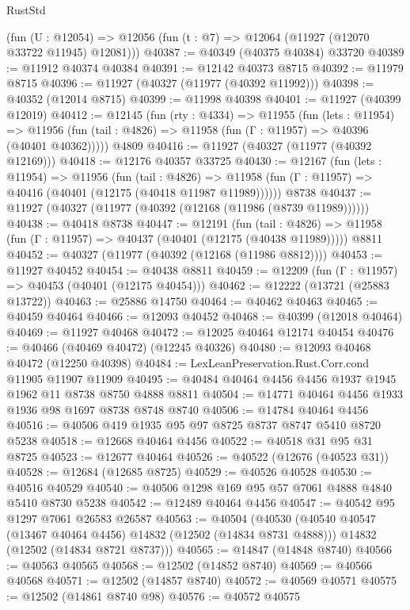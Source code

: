 \begin{lexlean}{RustStd}
\begin{coremodule}
    (fun (U : @12054) => @12056 (fun (t : @7) => @12064 (@11927 (@12070 @33722 @11945) @12081)))
@40387 := @40349 (@40375 @40384) @33720
@40389 := @11912 @40374 @40384
@40391 := @12142 @40373 @8715
@40392 := @11979 @8715
@40396 := @11927 (@40327 (@11977 (@40392 @11992)))
@40398 := @40352 (@12014 @8715)
@40399 := @11998 @40398
@40401 := @11927 (@40399 @12019)
@40412 := @12145
    (fun (rty : @4334) =>
    @11955
      (fun (lets : @11954) =>
      @11956 (fun (tail : @4826) => @11958 (fun (Γ : @11957) => @40396 (@40401 @40362)))))
    @4809
@40416 := @11927 (@40327 (@11977 (@40392 @12169)))
@40418 := @12176 @40357 @33725
@40430 := @12167
    (fun (lets : @11954) =>
    @11956
      (fun (tail : @4826) =>
      @11958 (fun (Γ : @11957) => @40416 (@40401 (@12175 (@40418 @11987 @11989))))))
    @8738
@40437 := @11927 (@40327 (@11977 (@40392 (@12168 (@11986 (@8739 @11989))))))
@40438 := @40418 @8738
@40447 := @12191
    (fun (tail : @4826) => @11958 (fun (Γ : @11957) => @40437 (@40401 (@12175 (@40438 @11989)))))
    @8811
@40452 := @40327 (@11977 (@40392 (@12168 (@11986 @8812))))
@40453 := @11927 @40452
@40454 := @40438 @8811
@40459 := @12209 (fun (Γ : @11957) => @40453 (@40401 (@12175 @40454)))
@40462 := @12222 (@13721 (@25883 @13722))
@40463 := @25886 @14750
@40464 := @40462 @40463
@40465 := @40459 @40464
@40466 := @12093 @40452
@40468 := @40399 (@12018 @40464)
@40469 := @11927 @40468
@40472 := @12025 @40464 @12174 @40454
@40476 := @40466 (@40469 @40472) (@12245 @40326)
@40480 := @12093 @40468 @40472 (@12250 @40398)
@40484 := LexLeanPreservation.Rust.Corr.cond @11905 @11907 @11909
@40495 := @40484 @40464 @4456 @4456 @1937 @1945 @1962 @11 @8738 @8750 @4888 @8811
@40504 := @14771 @40464 @4456 @1933 @1936 @98 @1697 @8738 @8748 @8740
@40506 := @14784 @40464 @4456
@40516 := @40506 @419 @1935 @95 @97 @8725 @8737 @8747 @5410 @8720 @5238
@40518 := @12668 @40464 @4456
@40522 := @40518 @31 @95 @31 @8725
@40523 := @12677 @40464
@40526 := @40522 (@12676 (@40523 @31))
@40528 := @12684 (@12685 @8725)
@40529 := @40526 @40528
@40530 := @40516 @40529
@40540 := @40506 @1298 @169 @95 @57 @7061 @4888 @4840 @5410 @8730 @5238
@40542 := @12489 @40464 @4456
@40547 := @40542 @95 @1297 @7061 @26583 @26587
@40563 := @40504
    (@40530
      (@40540 @40547 (@13467 @40464 @4456) @14832 (@12502 (@14834 @8731 @4888)))
      @14832
      (@12502 (@14834 @8721 @8737)))
@40565 := @14847 (@14848 @8740)
@40566 := @40563 @40565
@40568 := @12502 (@14852 @8740)
@40569 := @40566 @40568
@40571 := @12502 (@14857 @8740)
@40572 := @40569 @40571
@40575 := @12502 (@14861 @8740 @98)
@40576 := @40572 @40575

\end{coremodule}
\end{lexlean}
